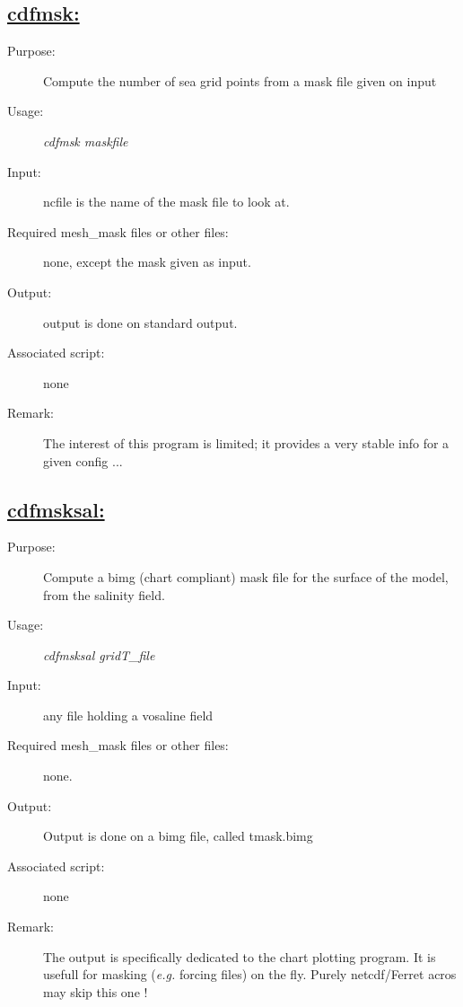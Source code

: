 \documentclass[a4paper,11pt]{article}
\begin{document}
\subsection*{\underline{cdfmsk:}}
\begin{description}
\item[Purpose:]  Compute the number of sea grid points from a mask file given on input
\item[Usage:] {\em cdfmsk maskfile}
\item[Input:] ncfile is the name of the mask file to look at.
\item[Required mesh\_mask files or other files:] none, except the mask given as input.
\item[Output:] output is done on standard output.
\item[Associated script:] none
\item[Remark:] The interest of this program is limited; it provides a very stable info for a given config ...
\end{description}

\newpage
\subsection*{\underline{cdfmsksal:}}
\begin{description}
\item[Purpose:]  Compute a bimg (chart compliant) mask file for the surface of the model, from the salinity field.
\item[Usage:] {\em cdfmsksal gridT\_file}
\item[Input:]  any file holding a vosaline field
\item[Required mesh\_mask files or other files:] none.
\item[Output:] Output is done on a bimg file, called tmask.bimg
\item[Associated script:] none
\item[Remark:] The output is specifically dedicated to the chart plotting program. It is usefull for masking ({\it e.g.}
forcing files) on the fly.  Purely netcdf/Ferret acros  may skip this one !
\end{description}
\end{document}
